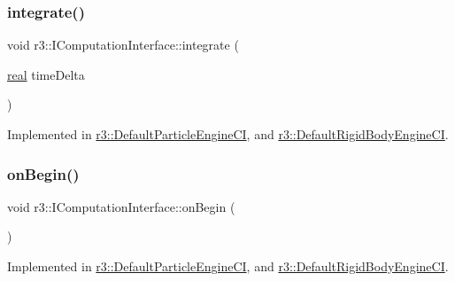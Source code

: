 \subsubsection{\texorpdfstring{integrate()}{integrate()}}
{\footnotesize\ttfamily void r3\+::\+I\+Computation\+Interface\+::integrate (\begin{DoxyParamCaption}\item[{\mbox{\hyperlink{namespacer3_ab2016b3e3f743fb735afce242f0dc1eb}{real}}}]{time\+Delta }\end{DoxyParamCaption})\hspace{0.3cm}{\ttfamily [pure virtual]}}



Implemented in \mbox{\hyperlink{classr3_1_1_default_particle_engine_c_i_a4603707afe6c841a83294a46ea4a1c62}{r3\+::\+Default\+Particle\+Engine\+CI}}, and \mbox{\hyperlink{classr3_1_1_default_rigid_body_engine_c_i_a4b79e7e4bc76eedcad7ef5c4777b9d33}{r3\+::\+Default\+Rigid\+Body\+Engine\+CI}}.

\mbox{\label{classr3_1_1_i_computation_interface_a430ebc9cb8d4ba064ac6a032ef07edd7}} 
\subsubsection{\texorpdfstring{on\+Begin()}{onBegin()}}
{\footnotesize\ttfamily void r3\+::\+I\+Computation\+Interface\+::on\+Begin (\begin{DoxyParamCaption}{ }\end{DoxyParamCaption})\hspace{0.3cm}{\ttfamily [pure virtual]}}



Implemented in \mbox{\hyperlink{classr3_1_1_default_particle_engine_c_i_aaf2e9ca87bff5e48c8eb59384e9cf180}{r3\+::\+Default\+Particle\+Engine\+CI}}, and \mbox{\hyperlink{classr3_1_1_default_rigid_body_engine_c_i_a5d9e40ea40845499f01081d21cd9ff64}{r3\+::\+Default\+Rigid\+Body\+Engine\+CI}}.

\mbox{\label{classr3_1_1_i_computation_interface_acae0c5fada7e414c74fe6f5a8f4a6c7d}} 
